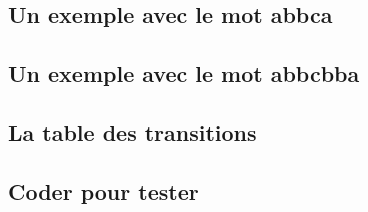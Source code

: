 \subsection{Un exemple avec le mot abbca}

	


\subsection{Un exemple avec le mot abbcbba}

	


\subsection{La table des transitions} \label{duplicate-table}

	


\subsection{Coder pour tester}

	
